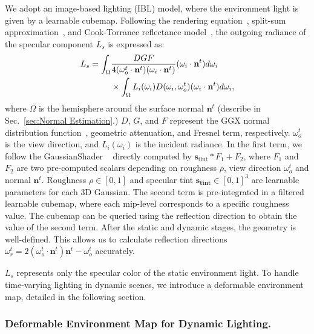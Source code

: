 \vspace{3pt}  
We adopt an image-based lighting (IBL) model, where the
environment light is given by a learnable cubemap. Following the rendering equation~\citep{kajiya1986rendering}, split-sum approximation~\citep{karis2013real, Munkberg_2022_CVPR}, and Cook-Torrance reflectance model~\citep{cook1982reflectance}, the outgoing radiance of the specular component $L_s$ is expressed as:
\begin{align}
L_s = \int_{\Omega} & \frac{DGF}{4 (\omega^t_o \cdot \mathbf{n}^t) (\omega_i \cdot \mathbf{n}^t)} 
    (\omega_i \cdot \mathbf{n}^t) d\omega_i \notag \\
    & \times \int_{\Omega} L_i(\omega_i) D(\omega_i, \omega^t_o) 
    (\omega_i \cdot \mathbf{n}^t) d\omega_i,
    \label{eq:specular_reflection}
\end{align}
where $\Omega$ is the hemisphere around the surface normal $\mathbf{n}^t$ (describe in Sec.~\ref{sec:Normal Estimation}.) $D$, $G$, and $F$ represent the GGX normal distribution function~\citep{walter2007microfacet}, geometric attenuation, and Fresnel term, respectively. $\omega^t_o$ is the view direction, and $L_i(\omega_i)$ is the incident radiance.
In the first term, we follow the GaussianShader ~\citep{jiang2024gaussianshader} directly computed by $\mathbf{s}_\text{tint} * F_1 + F_2$, where $F_1$ and $F_2$ are two pre-computed scalars depending on roughness $\rho$, view direction $\omega^t_o$ and normal $\mathbf{n}^t$. Roughness $\rho \in [0, 1]$ and specular tint $\mathbf{s_\mathbf{tint}} \in [0, 1]^3$ are learnable parameters for each 3D Gaussian. The second term is pre-integrated in a filtered learnable cubemap, where each mip-level corresponds to a specific roughness value. The cubemap can be queried using the reflection direction to obtain the value of the second term. After the static and dynamic stages, the geometry is well-defined. This allows us to calculate reflection directions $\omega^t_r = 2 (\omega^t_o \cdot \mathbf{n}^t) \mathbf{n}^t - \omega^t_o$ accurately.

$L_s$ represents only the specular color of the static environment light. To handle time-varying lighting in dynamic scenes, we introduce a deformable environment map, detailed in the following section.





\subsubsection{Deformable Environment Map for Dynamic Lighting.}

